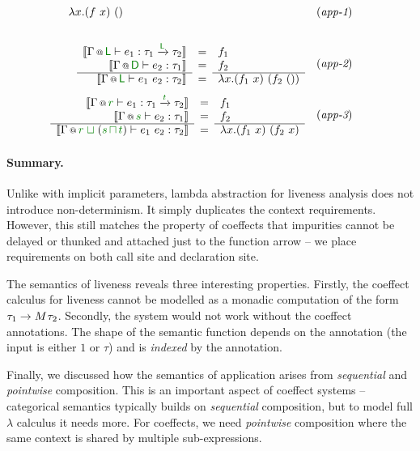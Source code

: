 \begin{figure}[t]
\begin{equation*}
\begin{array}{ll}
  {\lambda x . (f~x)~()}
& (\emph{app-1})
\\[2em]
\hspace{0.75em}\semdefff
  {\coctx{\Gamma}{\cclrd{\ident{L}}} \vdash e_1 : \tau_1 \xrightarrow{\cclrd{\ident{L}}} \tau_2}
  {\coctx{\Gamma}{\cclrd{\ident{D}}} \vdash e_2 : \tau_1}
  {\coctx{\Gamma}{\cclrd{\ident{L}}} \vdash e_1~e_2 : \tau_2}
  {f_1}
  {f_2}
  {\lambda x . (f_1~x)~(f_2~())}
& (\emph{app-2})
\\[2em]
\hspace{-1.6em}\semdefff
  {\coctx{\Gamma}{\cclrd{r}} \vdash e_1 : \tau_1 \xrightarrow{\cclrd{t}} \tau_2}
  {\coctx{\Gamma}{\cclrd{s}} \vdash e_2 : \tau_1}
  {\coctx{\Gamma}{\cclrd{r} \;\cclrd{\sqcup}\; (\cclrd{s} \,\cclrd{\sqcap}\, \cclrd{t})} \vdash e_1~e_2 : \tau_2}
  {f_1}
  {f_2}
  {\lambda x . (f_1~x)~(f_2~x)}
& (\emph{app-3})
\end{array}
\end{equation*}

\label{fig:applications-flat-livsem}
\vspace{0.5em}
\end{figure}


\paragraph{Summary.}
Unlike with implicit parameters, lambda abstraction for liveness analysis does not introduce
non-determinism. It simply duplicates the context requirements. However, this still matches the
property of coeffects that impurities cannot be delayed or thunked and attached just to the
function arrow -- we place requirements on both call site and declaration site.

The semantics of liveness reveals three interesting properties. Firstly, the coeffect calculus for
liveness cannot be modelled as a monadic computation of the form $\tau_1 \rightarrow M^{}\tau_2$.
Secondly, the system would not work without the coeffect annotations.
The shape of the semantic function depends on the annotation (the input is either $1$ or $\tau$) and
is \emph{indexed} by the annotation.

Finally, we discussed how the semantics of application arises from \emph{sequential} and
\emph{pointwise} composition. This is an important aspect of coeffect systems -- categorical
semantics typically builds on \emph{sequential} composition, but to model full $\lambda$ calculus
it needs more. For coeffects, we need \emph{pointwise} composition where the same context
is shared by multiple sub-expressions.

